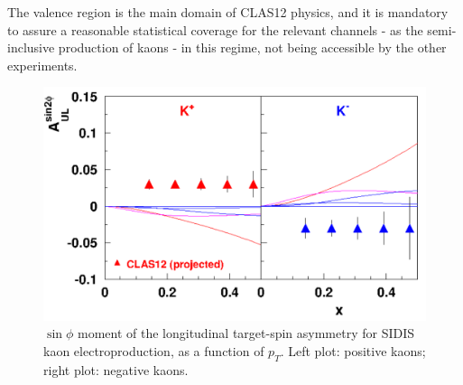 The valence region is the main domain of CLAS12 physics, and it is mandatory to assure a reasonable statistical coverage for the relevant channels - as the semi-inclusive production of kaons - in this regime, not being accessible by the other experiments. 
%
\begin{figure}
\centering
\includegraphics[width=1.0\textwidth]{sidis/aul_kaons_x2.pdf}
\caption{\label{fig::AULptcosdeutkaonsx2}$\sin\phi$ moment of the longitudinal target-spin asymmetry for SIDIS kaon electroproduction, as a function of $p_T$. Left plot: positive kaons; right plot: negative kaons.}
\end{figure}
%
%
